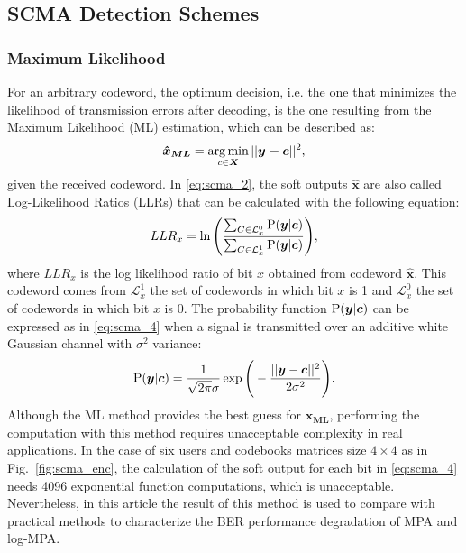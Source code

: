 \subsection{SCMA Detection Schemes}
\label{sec:scma_detection}

\subsubsection{Maximum Likelihood}
\label{sec:scma_ml}

For an arbitrary codeword, the optimum decision, i.e. the one that minimizes the
likelihood of transmission errors after decoding, is the one resulting from the
Maximum Likelihood (ML) estimation, which can be described as:
\begin{equation}
  \label{eq:scma_2}
  \bm{\hat{x}_{ML}} = \operatorname*{arg\,min}_{c \in \bm{X}}||\bm{y - c}||^2,
\end{equation}
given the received codeword. In \eqref{eq:scma_2}, the soft outputs
$\hat{\bm{x}}$ are also called Log-Likelihood Ratios (LLRs) that can be
calculated with the following equation:
\begin{equation}
  \label{eq:scma_3}
  LLR_x = \ln\Bigg(\frac{\sum_{C\in\mathcal{L}_x^0} \operatorname{P}(\bm{y}|\bm{c})}
  {\sum_{C\in\mathcal{L}_x^1} \operatorname{P}(\bm{y}|\bm{c})}\Bigg),
\end{equation}
where $LLR_x$ is the log likelihood ratio of bit $x$ obtained from codeword
$\hat{\bm{x}}$. This codeword comes from $\mathcal{L}_x^1$ the set of codewords
in which bit $x$ is 1 and $\mathcal{L}_x^0$ the set of codewords in which bit
$x$ is 0. The probability function $\operatorname{P}(\bm{y}|\bm{c})$ can be expressed as
in \eqref{eq:scma_4} when a signal is transmitted over an additive white
Gaussian channel with $\sigma^2$ variance:
\begin{equation}
  \label{eq:scma_4}
  \operatorname{P}(\bm{y}|\bm{c}) = \frac{1}{\sqrt{2\pi}\sigma}\exp
  \Bigg(-\frac{||\bm{y}-\bm{c}||^2}{2\sigma^2}\Bigg).
\end{equation}
Although the ML method provides the best guess for $\bm{\hat{x}_{ML}}$,
performing the computation with this method requires unacceptable complexity in
real applications. In the case of six users and codebooks matrices size
$4\times4$ as in Fig.~\ref{fig:scma_enc}, the calculation of the soft output
for each bit in \eqref{eq:scma_4} needs 4096 exponential function computations,
which is unacceptable. Nevertheless, in this article the result of this method
is used to compare with practical methods to characterize the BER performance
degradation of MPA and log-MPA.

